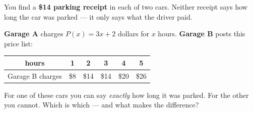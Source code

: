 \documentclass[10pt]{article}
\begin{document}
\vspace{0.1in}

\boxguard[22]
\begin{hookbox}
You find a \textbf{\$14 parking receipt} in each of two cars. Neither receipt
says how long the car was parked --- it only says what the driver paid.

\smallskip
\textbf{Garage A} charges $P(x) = 3x + 2$ dollars for $x$ hours.
\textbf{Garage B} posts this price list:

\smallskip
\renewcommand{\arraystretch}{1.3}
\begin{center}
\begin{tabular}{|c|c|c|c|c|c|}
\hline
hours & 1 & 2 & 3 & 4 & 5 \\
\hline
Garage B charges & \$8 & \$14 & \$14 & \$20 & \$26 \\
\hline
\end{tabular}
\end{center}

\smallskip
For one of these cars you can say \textit{exactly} how long it was parked. For
the other you cannot. Which is which --- and what makes the difference?
\end{hookbox}

\vspace{0.1in}
\end{document}
